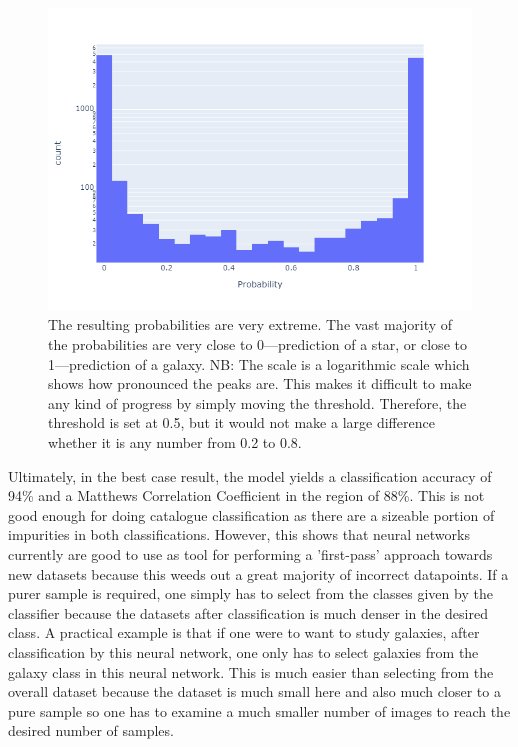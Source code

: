 \documentclass[a4paper,fleqn,usenatbib]{mnras}
\begin{document}
\begin{figure}
\includegraphics[width=\columnwidth]{../Figures/probability}
\caption{The resulting probabilities are very extreme. The vast majority of the probabilities are very close to 0---prediction of a star, or close to 1---prediction of a galaxy. NB: The scale is a logarithmic scale which shows how pronounced the peaks are. This makes it difficult to make any kind of progress by simply moving the threshold. Therefore, the threshold is set at 0.5, but it would not make a large difference whether it is any number from 0.2 to 0.8. \label{fig:probability}}
\end{figure}


Ultimately, in the best case result, the model yields a classification accuracy of 94\% and a Matthews Correlation Coefficient in the region of 88\%. This is not good enough for doing catalogue classification as there are a sizeable portion of impurities in both classifications. However, this shows that neural networks currently are good to use as tool for performing a 'first-pass' approach towards new datasets because this weeds out a great majority of incorrect datapoints. If a purer sample is required, one simply has to select from the classes given by the classifier because the datasets after classification is much denser in the desired class. A practical example is that if one were to want to study galaxies, after classification by this neural network, one only has to select galaxies from the galaxy class in this neural network. This is much easier than selecting from the overall dataset because the dataset is much small here and also much closer to a pure sample so one has to examine a much smaller number of images to reach the desired number of samples. 
\end{document}
